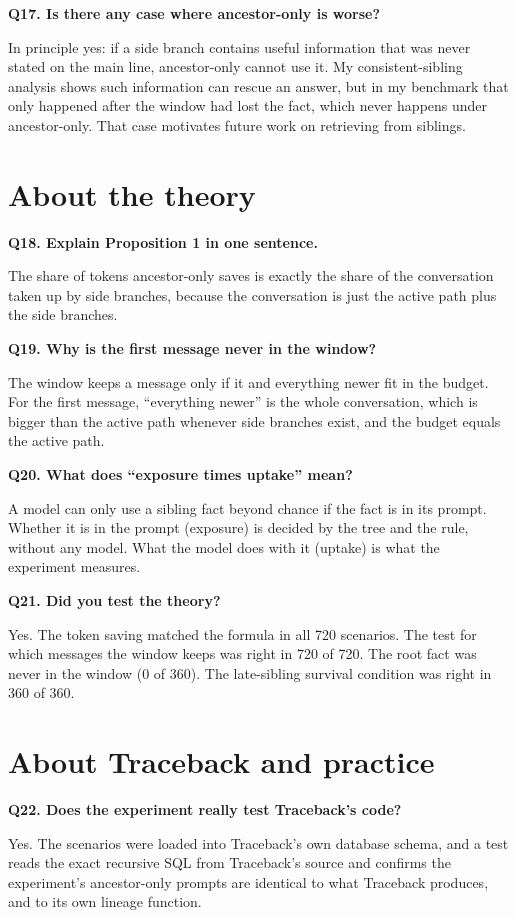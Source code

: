 \textbf{Q17. Is there any case where ancestor-only is worse?}\par
In principle yes: if a side branch contains useful information that was never stated on the main line, ancestor-only cannot use it. My consistent-sibling analysis shows such information can rescue an answer, but in my benchmark that only happened after the window had lost the fact, which never happens under ancestor-only. That case motivates future work on retrieving from siblings.

\section*{About the theory}

\textbf{Q18. Explain Proposition 1 in one sentence.}\par
The share of tokens ancestor-only saves is exactly the share of the conversation taken up by side branches, because the conversation is just the active path plus the side branches.

\textbf{Q19. Why is the first message never in the window?}\par
The window keeps a message only if it and everything newer fit in the budget. For the first message, ``everything newer'' is the whole conversation, which is bigger than the active path whenever side branches exist, and the budget equals the active path.

\textbf{Q20. What does ``exposure times uptake'' mean?}\par
A model can only use a sibling fact beyond chance if the fact is in its prompt. Whether it is in the prompt (exposure) is decided by the tree and the rule, without any model. What the model does with it (uptake) is what the experiment measures.

\textbf{Q21. Did you test the theory?}\par
Yes. The token saving matched the formula in all 720 scenarios. The test for which messages the window keeps was right in 720 of 720. The root fact was never in the window (0 of 360). The late-sibling survival condition was right in 360 of 360.

\section*{About Traceback and practice}

\textbf{Q22. Does the experiment really test Traceback's code?}\par
Yes. The scenarios were loaded into Traceback's own database schema, and a test reads the exact recursive SQL from Traceback's source and confirms the experiment's ancestor-only prompts are identical to what Traceback produces, and to its own lineage function.

